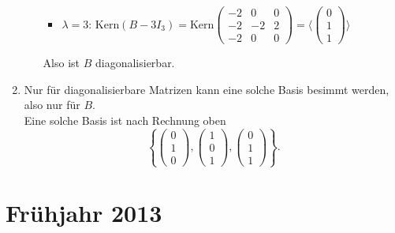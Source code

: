 \begin{enumerate}
\begin{itemize}
\begin{itemize}
	 	  	\item \( \lambda = 3 \): \( \text{Kern}(B - 3I_3) = \text{Kern}\begin{pmatrix}
	 	  		-2 & 0 & 0 \\
	 	  		-2 & -2 & 2 \\
	 	  		-2 & 0 & 0
	 	  	\end{pmatrix} = \langle \begin{pmatrix}
	 	  		0 \\ 1 \\ 1
	 	  	\end{pmatrix} \rangle \)
	 	  \end{itemize} 
	 	  Also ist \( B \) diagonalisierbar.
	 \end{itemize}

	 \item Nur für diagonalisierbare Matrizen kann eine solche Basis besimmt werden, also nur für \( B \).
	 	\\
	 	Eine solche Basis ist nach Rechnung oben
	 	\begin{equation*}
	 		\left \{ \begin{pmatrix}
	 			0 \\ 1 \\ 0
	 		\end{pmatrix}, \begin{pmatrix}
	 			1 \\ 0 \\ 1
	 		\end{pmatrix}, \begin{pmatrix}
	 			0 \\ 1 \\ 1
	 		\end{pmatrix} \right \}\text{.}
	 	\end{equation*}
\end{enumerate}

\newpage

\section{Frühjahr 2013}


